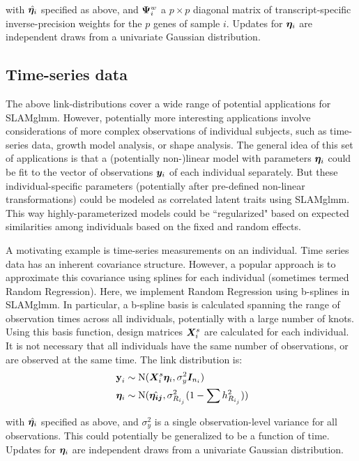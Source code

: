 \documentclass[11pt]{amsart}
\newcommand*{\B}[1]{\ifmmode\bm{#1}\else\textbf{#1}\fi}
\begin{document}
\noindent with $\hat{\B{\eta}_i}$ specified as above, and $\B{\Psi}^w_i$ a $p \times p$ diagonal matrix of transcript-specific inverse-precision weights for the $p$ genes of sample $i$. Updates for $\B{\eta}_i$ are independent draws from a univariate Gaussian distribution.

\subsection{Time-series data}
The above link-distributions cover a wide range of potential applications for SLAMglmm. However, potentially more interesting applications involve considerations of more complex observations of individual subjects, such as time-series data, growth model analysis, or shape analysis. The general idea of this set of applications is that a (potentially non-)linear model with parameters $\B{\eta}_i$ could be fit to the vector of observations $\B{y}_i$ of each individual separately. But these individual-specific parameters (potentially after pre-defined non-linear transformations) could be modeled as correlated latent traits using SLAMglmm. This way highly-parameterized models could be ``regularized" based on expected similarities among individuals based on the fixed and random effects.

A motivating example is time-series measurements on an individual. Time series data has an inherent covariance structure. However, a popular approach is to approximate this covariance using splines for each individual (sometimes termed Random Regression). Here, we implement Random Regression using b-splines in SLAMglmm. In particular, a b-spline basis is calculated spanning the range of observation times across all individuals, potentially with a large number of knots. Using this basis function,
design matrices $\B{X}^s_i$ are calculated for each individual. It is not necessary that all individuals have the same number of observations, or are observed at the same time. The link distribution is:
\begin{align} \begin{split}
\B{y}_i &\sim \mbox{N}(\B{X}^s_i \B{\eta}_i, \sigma^2_y \B{I}_{n_i}) \\
\;\B{\eta}_i &\sim \mbox{N}(\hat{\B{\eta_{ij}}},\sigma^2_{R_{i_j}}(1-\sum h^2_{R_{i_j}}))
\end{split}\end{align}

\noindent with $\hat{\B{\eta}_i}$ specified as above, and $\sigma^2_y$ is a single observation-level variance for all observations. This could potentially be generalized to be a function of time. Updates for $\B{\eta}_i$ are independent draws from a univariate Gaussian distribution.
\end{document}
